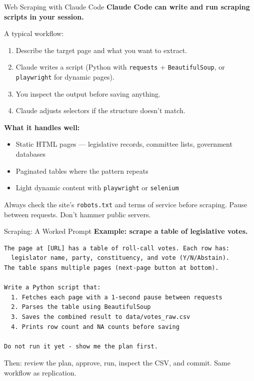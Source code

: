 \documentclass[aspectratio=169, 11pt]{beamer}
\begin{document}
\begin{frame}{Web Scraping with Claude Code}
  \textbf{Claude Code can write and run scraping scripts in your session.}

  \vspace{0.5em}
  A typical workflow:
  \begin{enumerate}\small
    \item Describe the target page and what you want to extract.
    \item Claude writes a script (Python with \texttt{requests} + \texttt{BeautifulSoup}, or \texttt{playwright} for dynamic pages).
    \item You inspect the output before saving anything.
    \item Claude adjusts selectors if the structure doesn't match.
  \end{enumerate}

  \vspace{0.5em}
  \textbf{What it handles well:}
  \begin{itemize}\small
    \item Static HTML pages --- legislative records, committee lists, government databases
    \item Paginated tables where the pattern repeats
    \item Light dynamic content with \texttt{playwright} or \texttt{selenium}
  \end{itemize}

  \vspace{0.4em}
  \alert{\small Always check the site's \texttt{robots.txt} and terms of service before scraping. Pause between requests. Don't hammer public servers.}
\end{frame}

\begin{frame}[fragile]{Scraping: A Worked Prompt}
  \textbf{Example: scrape a table of legislative votes.}

  \vspace{0.4em}
  \begin{lstlisting}[basicstyle=\ttfamily\scriptsize]
The page at [URL] has a table of roll-call votes. Each row has:
  legislator name, party, constituency, and vote (Y/N/Abstain).
The table spans multiple pages (next-page button at bottom).

Write a Python script that:
  1. Fetches each page with a 1-second pause between requests
  2. Parses the table using BeautifulSoup
  3. Saves the combined result to data/votes_raw.csv
  4. Prints row count and NA counts before saving

Do not run it yet - show me the plan first.
  \end{lstlisting}

  \vspace{0.3em}
  {\small Then: review the plan, approve, run, inspect the CSV, and commit. Same workflow as replication.}
\end{frame}
\end{document}
